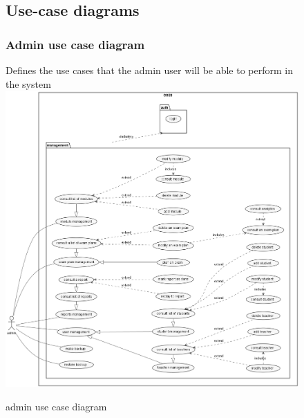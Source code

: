 \documentclass[]{uc2pfecaneva}
\begin{document}


    \begin{figure}
        \raggedright\subsection{Use-case diagrams}
        \subsubsection{Admin use case diagram}
        Defines the use cases that the admin user will be able to perform in the system
        \linebreak
        \includegraphics[width=\textwidth]{images/admin_UCD}
        \caption{admin use case diagram}
    \end{figure}
    \clearpage
\end{document}
